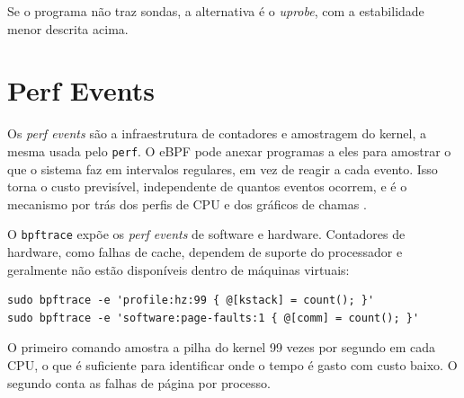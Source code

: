 Se o programa não traz sondas, a alternativa é o \textit{uprobe}, com a estabilidade menor descrita acima.

\section{Perf Events}

Os \textit{perf events} são a infraestrutura de contadores e amostragem do kernel, a mesma usada pelo \texttt{perf}. O eBPF pode anexar programas a eles para amostrar o que o sistema faz em intervalos regulares, em vez de reagir a cada evento. Isso torna o custo previsível, independente de quantos eventos ocorrem, e é o mecanismo por trás dos perfis de CPU e dos gráficos de chamas \cite{gregg2019}.

O \texttt{bpftrace} expõe os \textit{perf events} de software e hardware. Contadores de hardware, como falhas de cache, dependem de suporte do processador e geralmente não estão disponíveis dentro de máquinas virtuais:

\begin{lstlisting}
sudo bpftrace -e 'profile:hz:99 { @[kstack] = count(); }'
sudo bpftrace -e 'software:page-faults:1 { @[comm] = count(); }'
\end{lstlisting}

O primeiro comando amostra a pilha do kernel 99 vezes por segundo em cada CPU, o que é suficiente para identificar onde o tempo é gasto com custo baixo. O segundo conta as falhas de página por processo.

